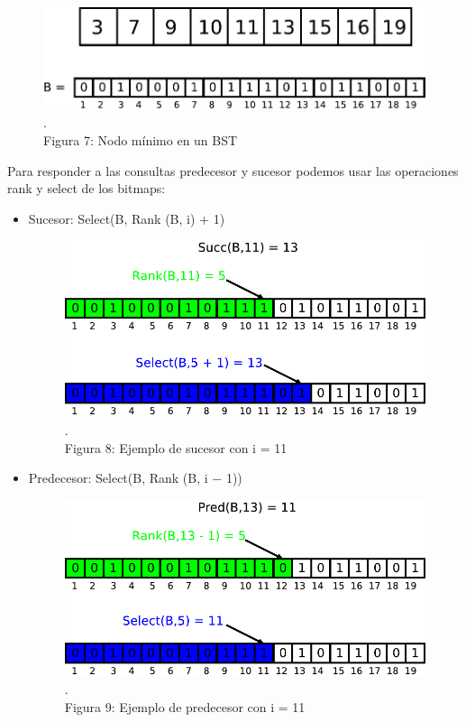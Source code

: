 \documentclass[11pt]{article}
\begin{document}
\begin{figure}[htp]
\centering
\includegraphics[scale=0.5]{bitmap.pdf}
\\\scriptsize{\color{white}.\color{black}\\Figura 7: Nodo mínimo en un BST}
\end{figure}
Para responder a las consultas predecesor y sucesor podemos usar las operaciones rank y select de los bitmaps:
\begin{itemize}
\item Sucesor: Select(B, Rank (B, i) + 1)
\begin{figure}[htp]
\centering
\includegraphics[scale=0.5]{bitmapsuc.pdf}
\\\scriptsize{\color{white}.\color{black}\\Figura 8: Ejemplo de sucesor con i = 11}
\end{figure}
\item Predecesor: Select(B, Rank (B, i $-$ 1))
\begin{figure}[htp]
\centering
\includegraphics[scale=0.5]{bitmappred.pdf}
\\\scriptsize{\color{white}.\color{black}\\Figura 9: Ejemplo de predecesor con i = 11}
\end{figure}
\end{itemize}
\end{document}
